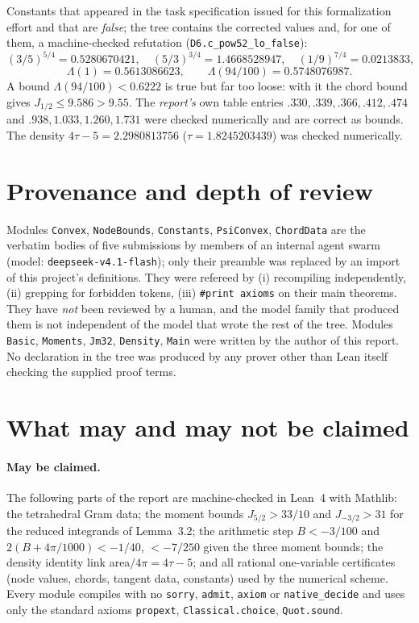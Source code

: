 \documentclass[11pt]{article}
\newcommand{\Ln}[1]{\texttt{#1}}
\begin{document}
Constants that appeared in the task specification issued for this formalization effort and that
are \emph{false}; the tree contains the corrected values and, for one of them, a machine-checked
refutation (\Ln{D6.c\_\allowbreak{}pow52\_\allowbreak{}lo\_\allowbreak{}false}):
\[
(3/5)^{5/4}=0.5280670421,\quad (5/3)^{3/4}=1.4668528947,\quad (1/9)^{7/4}=0.0213833,
\]
\[
\Lambda(1)=0.5613086623,\qquad \Lambda(94/100)=0.5748076987 .
\]
A bound $\Lambda(94/100)<0.6222$ is true but far too loose: with it the chord bound gives
$J_{1/2}\le9.586>9.55$. The \emph{report's} own table entries
$.330,.339,.366,.412,.474$ and $.938,1.033,1.260,1.731$ were checked numerically and are
correct as bounds. The density $4\tau-5=2.2980813756$ ($\tau=1.8245203439$) was checked
numerically.

\section{Provenance and depth of review}

Modules \Ln{Convex}, \Ln{NodeBounds}, \Ln{Constants}, \Ln{PsiConvex}, \Ln{ChordData} are the
verbatim bodies of five submissions by members of an internal agent swarm (model:
\Ln{deepseek-v4.1-flash}); only their preamble was replaced by an import of this project's
definitions. They were refereed by (i) recompiling independently, (ii) grepping for forbidden
tokens, (iii) \Ln{\#print axioms} on their main theorems. They have \emph{not} been reviewed by
a human, and the model family that produced them is not independent of the model that wrote the
rest of the tree. Modules \Ln{Basic}, \Ln{Moments}, \Ln{Jm32}, \Ln{Density}, \Ln{Main} were
written by the author of this report. No declaration in the tree was produced by any prover
other than Lean itself checking the supplied proof terms.

\section{What may and may not be claimed}
\label{sec:claims}

\paragraph{May be claimed.} The following parts of the report are machine-checked in Lean~4 with
Mathlib: the tetrahedral Gram data; the moment bounds $J_{5/2}>33/10$ and $J_{-3/2}>31$ for the
reduced integrands of Lemma~3.2; the arithmetic step $B<-3/100$ and
$2(B+4\pi/1000)<-1/40$, $<-7/250$ given the three moment bounds; the density identity
link area$/4\pi=4\tau-5$; and all rational one-variable certificates (node values, chords,
tangent data, constants) used by the numerical scheme. Every module compiles with no
\Ln{sorry}, \Ln{admit}, \Ln{axiom} or \Ln{native\_\allowbreak{}decide} and uses only the standard axioms
\Ln{propext}, \Ln{Classical.choice}, \Ln{Quot.sound}.
\end{document}
